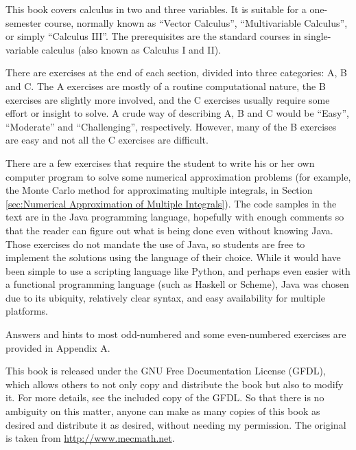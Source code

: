 This book covers calculus in two and three variables. It is suitable for a one-semester course, normally known as
``Vector Calculus'', ``Multivariable Calculus'', or simply ``Calculus III''. 
The prerequisites are the standard courses
in single-variable calculus (also known as Calculus I and II).

There are exercises at the end of each section, divided into three categories: A, B and C. 
The A exercises are mostly
of a routine computational nature, the B exercises are slightly more involved, and the C exercises usually require
some effort or insight to solve. 
A crude way of describing A, B and C would be ``Easy'', ``Moderate'' and ``Challenging'', respectively. 
However, many of the B exercises are easy and not all
the C exercises are difficult.

There are a few exercises that require the student to write his or her own computer program
to solve some numerical approximation problems (for example, the Monte Carlo method for approximating multiple integrals, in
Section \ref{sec:Numerical Approximation of Multiple Integrals}).
The code samples in the text are in the Java programming language, hopefully with enough comments so that the reader can
figure out what is being done even without knowing Java. Those exercises do not mandate the use of Java, so
students are free to implement the solutions using the language of their choice. While it would have been simple to
use a scripting language like Python, and perhaps even easier with a functional programming language (such as Haskell or Scheme), 
Java was chosen due to its ubiquity, relatively clear syntax, and easy availability for multiple platforms.

Answers and hints to most odd-numbered and some even-numbered exercises are
provided in Appendix A. 

This book is released under the GNU Free Documentation License (GFDL), which allows others to not only copy and
distribute the book but also to modify it. 
For more details, see the included copy of the GFDL. So that there is no
ambiguity on this matter, anyone can make as many copies of this book as desired and distribute it as desired,
without needing my permission.  
The original is taken from \url{http://www.mecmath.net}. 
